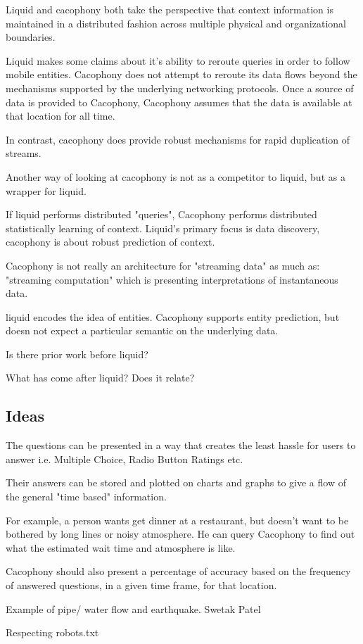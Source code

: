 Liquid and cacophony both take the perspective that context information is
maintained in a distributed fashion across multiple physical and organizational
boundaries.

Liquid makes some claims about it's ability to reroute queries in order to
follow mobile entities.  Cacophony does not attempt to reroute its data flows
beyond the mechanisms supported by the underlying networking protocols.  Once a
source of data is provided to Cacophony, Cacophony assumes that the data is
available at that location for all time.

In contrast, cacophony does provide robust mechanisms for rapid duplication of
streams.  

Another way of looking at cacophony is not as a competitor to liquid, but as a
wrapper for liquid. 

If liquid performs distributed "queries", Cacophony performs distributed
statistically learning of context.  Liquid's primary focus is data discovery,
cacophony is about robust prediction of context.

Cacophony is not really an architecture for "streaming data" as much as:
"streaming computation" which is presenting interpretations of instantaneous
data.

liquid encodes the idea of entities.  Cacophony supports entity prediction, but
doesn not expect a particular semantic on the underlying data.



Is there prior work before liquid?

What has come after liquid?  Does it relate?
\cite{Hong2004}



\subsection{Ideas}

The questions can be presented in a way that creates the least hassle for users
to answer i.e. Multiple Choice, Radio Button Ratings etc.

Their answers can be
stored and plotted on charts and graphs to give a flow of the general "time
based" information. 

For
example, a person wants get dinner at a restaurant, but doesn't want to be
bothered by long lines or noisy atmosphere. He can query Cacophony to find out
what the estimated wait time and atmosphere is like. 

Cacophony should also
present a percentage of accuracy based on the frequency of answered questions,
in a given time frame, for that location.



Example of pipe/ water flow and earthquake.
Swetak Patel

Respecting robots.txt



